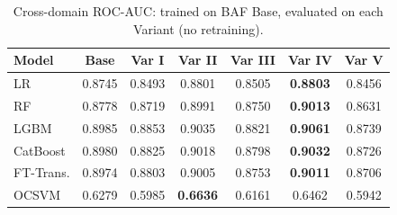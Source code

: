 \begin{table}[H]
\centering
\caption{Cross-domain ROC-AUC: trained on BAF Base, evaluated on each Variant (no retraining).}
\label{tab:crossdomain_rocauc}
\begin{tabular}{l c c c c c c}
\toprule
Model & Base & Var I & Var II & Var III & Var IV & Var V \\
\midrule
LR         & 0.8745 & 0.8493 & 0.8801 & 0.8505 & \textbf{0.8803} & 0.8456 \\
RF         & 0.8778 & 0.8719 & 0.8991 & 0.8750 & \textbf{0.9013} & 0.8631 \\
LGBM       & 0.8985 & 0.8853 & 0.9035 & 0.8821 & \textbf{0.9061} & 0.8739 \\
CatBoost   & 0.8980 & 0.8825 & 0.9018 & 0.8798 & \textbf{0.9032} & 0.8726 \\
FT-Trans.  & 0.8974 & 0.8803 & 0.9005 & 0.8753 & \textbf{0.9011} & 0.8706 \\
OCSVM      & 0.6279 & 0.5985 & \textbf{0.6636} & 0.6161 & 0.6462 & 0.5942 \\
\bottomrule
\end{tabular}
\end{table}